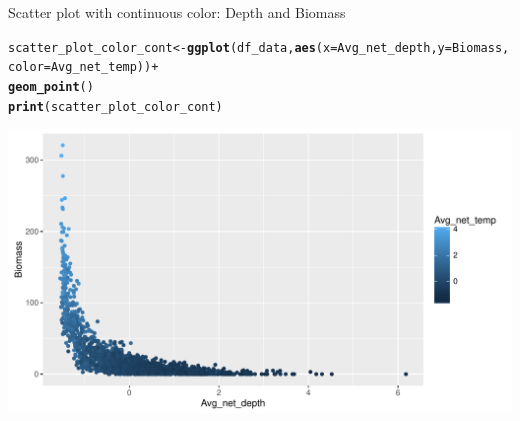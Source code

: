 \documentclass{beamer}\usepackage[]{graphicx}\usepackage[]{color}
\makeatletter
\newcommand{\hlopt}[1]{\textcolor[rgb]{0,0,0}{#1}}%
\newcommand{\hlstd}[1]{\textcolor[rgb]{0.345,0.345,0.345}{#1}}%
\newcommand{\hlkwb}[1]{\textcolor[rgb]{0.69,0.353,0.396}{#1}}%
\newcommand{\hlkwc}[1]{\textcolor[rgb]{0.333,0.667,0.333}{#1}}%
\newcommand{\hlkwd}[1]{\textcolor[rgb]{0.737,0.353,0.396}{\textbf{#1}}}%
\newenvironment{kframe}{%
 \def\at@end@of@kframe{}%
 \ifinner\ifhmode%
  \def\at@end@of@kframe{\end{minipage}}%
  \begin{minipage}{\columnwidth}%
 \fi\fi%
 \def\FrameCommand##1{\hskip\@totalleftmargin \hskip-\fboxsep
 \colorbox{shadecolor}{##1}\hskip-\fboxsep
     \hskip-\linewidth \hskip-\@totalleftmargin \hskip\columnwidth}%
 \MakeFramed {\advance\hsize-\width
   \@totalleftmargin\z@ \linewidth\hsize
   \@setminipage}}%
 {\par\unskip\endMakeFramed%
 \at@end@of@kframe}
\newenvironment{knitrout}{}{} %
\makeatother
\begin{document}
\begin{frame}[fragile]{Scatter plot with continuous color: Depth and Biomass}
\begin{knitrout}\footnotesize
{}\color{fgcolor}\begin{kframe}
\begin{alltt}
  \hlstd{scatter_plot_color_cont} \hlkwb{<-} \hlkwd{ggplot}\hlstd{(df_data,} \hlkwd{aes}\hlstd{(}\hlkwc{x}\hlstd{=Avg_net_depth,} \hlkwc{y}\hlstd{=Biomass,}
                                         \hlkwc{color}\hlstd{=Avg_net_temp))} \hlopt{+}
  \hlkwd{geom_point}\hlstd{()}
  \hlkwd{print}\hlstd{(scatter_plot_color_cont)}
\end{alltt}
\end{kframe}

{\centering \includegraphics[width=.9\linewidth]{figure/scatter_plot_color_cont-1} 

}



\end{knitrout}
\end{frame}
\end{document}
